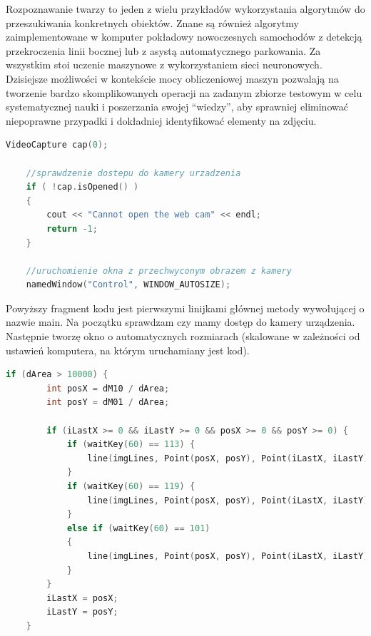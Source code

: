 \documentclass{article}
\begin{document}
\par
Rozpoznawanie twarzy to jeden z wielu przykładów wykorzystania algorytmów do przeszukiwania konkretnych obiektów. Znane są również algorytmy zaimplementowane w komputer pokładowy nowoczesnych samochodów z detekcją przekroczenia linii bocznej lub z asystą automatycznego parkowania. Za wszystkim stoi uczenie maszynowe z wykorzystaniem sieci neuronowych. Dzisiejsze możliwości w kontekście mocy obliczeniowej maszyn pozwalają na tworzenie bardzo skomplikowanych operacji na zadanym zbiorze testowym w celu systematycznej nauki i poszerzania swojej “wiedzy”, aby sprawniej eliminować niepoprawne przypadki i dokładniej identyfikować elementy na zdjęciu.




\newpage
\begin{lstlisting}[language=C++, caption=Początek wywołania]
	VideoCapture cap(0);
	
	//sprawdzenie dostepu do kamery urzadzenia
	if ( !cap.isOpened() )
	{
		cout << "Cannot open the web cam" << endl;
		return -1;
	}
	
	//uruchomienie okna z przechwyconym obrazem z kamery
	namedWindow("Control", WINDOW_AUTOSIZE);
\end{lstlisting}

Powyższy fragment kodu jest pierwszymi linijkami głównej metody wywołującej o nazwie main. Na początku sprawdzam czy mamy dostęp do kamery urządzenia. Następnie tworzę okno o automatycznych rozmiarach (skalowane w zależności od ustawień komputera, na którym uruchamiany jest kod).

\begin{lstlisting}[language=C++, caption=Klawisze funkcyjne]
	if (dArea > 10000) {
		int posX = dM10 / dArea;
		int posY = dM01 / dArea;        
		
		if (iLastX >= 0 && iLastY >= 0 && posX >= 0 && posY >= 0) {
			if (waitKey(60) == 113) {
				line(imgLines, Point(posX, posY), Point(iLastX, iLastY), Scalar(0,0,255), 15);
			}
			if (waitKey(60) == 119) {
				line(imgLines, Point(posX, posY), Point(iLastX, iLastY), Scalar(0,255,0), 15); 
			}
			else if (waitKey(60) == 101)
			{
				line(imgLines, Point(posX, posY), Point(iLastX, iLastY), Scalar(0,0,0), 15); 
			}
		}
		iLastX = posX;
		iLastY = posY;
	}
\end{lstlisting}
\end{document}
